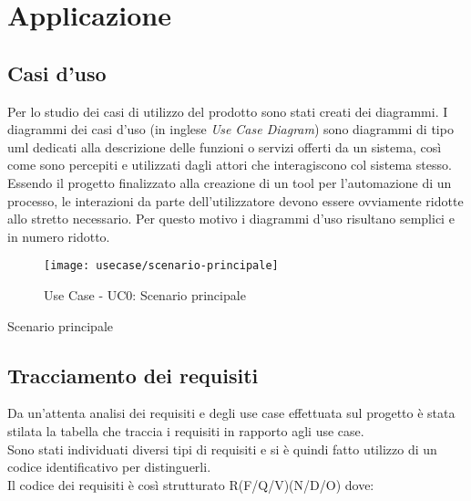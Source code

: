 
\chapter{Applicazione}
\label{cap:applicazione}

\section{Casi d'uso}

Per lo studio dei casi di utilizzo del prodotto sono stati creati dei diagrammi.
I diagrammi dei casi d'uso (in inglese \emph{Use Case Diagram}) sono diagrammi di tipo \gls{uml} dedicati alla descrizione delle funzioni o servizi offerti da un sistema, così come sono percepiti e utilizzati dagli attori che interagiscono col sistema stesso.
Essendo il progetto finalizzato alla creazione di un tool per l'automazione di un processo, le interazioni da parte dell'utilizzatore devono essere ovviamente ridotte allo stretto necessario. Per questo motivo i diagrammi d'uso risultano semplici e in numero ridotto.

\begin{figure}[!h] 
	\centering 
	\texttt{[image: usecase/scenario-principale]} 
	\caption{Use Case - UC0: Scenario principale}
\end{figure}

\begin{usecase}{0}{Scenario principale}
	\label{uc:scenario-principale}
\end{usecase}

\section{Tracciamento dei requisiti}

Da un'attenta analisi dei requisiti e degli use case effettuata sul progetto è stata stilata la tabella che traccia i requisiti in rapporto agli use case.\\
Sono stati individuati diversi tipi di requisiti e si è quindi fatto utilizzo di un codice identificativo per distinguerli.\\
Il codice dei requisiti è così strutturato R(F/Q/V)(N/D/O) dove:

